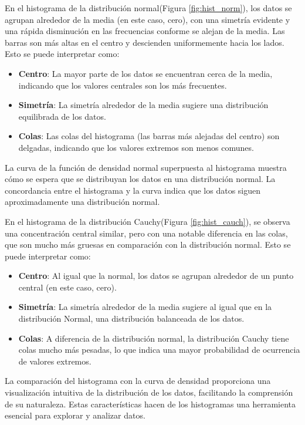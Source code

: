 \documentclass[../Main.tex]{subfiles}
\begin{document}
En el histograma de la distribución normal(Figura \ref{fig:hist_norm}), los datos se agrupan alrededor de la media (en este caso, cero), con una simetría evidente y una rápida disminución en las frecuencias conforme se alejan de la media. Las barras son más altas en el centro y descienden uniformemente hacia los lados. Esto se puede interpretar como:
\begin{itemize}
    \item \textbf{Centro}: La mayor parte de los datos se encuentran cerca de la media, indicando que los valores centrales son los más frecuentes.
    \item \textbf{Simetría}: La simetría alrededor de la media sugiere una distribución equilibrada de los datos.
    \item \textbf{Colas}: Las colas del histograma (las barras más alejadas del centro) son delgadas, indicando que los valores extremos son menos comunes.
\end{itemize}
 La curva de la función de densidad normal superpuesta al histograma muestra cómo se espera que se distribuyan los datos en una distribución normal. La concordancia entre el histograma y la curva indica que los datos siguen aproximadamente una distribución normal.

En el histograma de la distribución Cauchy(Figura \ref{fig:hist_cauch}), se observa una concentración central similar, pero con una notable diferencia en las colas, que son mucho más gruesas en comparación con la distribución normal. Esto se puede interpretar como:
\begin{itemize}
    \item \textbf{Centro}: Al igual que la normal, los datos se agrupan alrededor de un punto central (en este caso, cero).
       \item \textbf{Simetría}: La simetría alrededor de la media sugiere al igual que en la distribución Normal, una distribución balanceada de los datos.
    \item \textbf{Colas}: A diferencia de la distribución normal, la distribución Cauchy tiene colas mucho más pesadas, lo que indica una mayor probabilidad de ocurrencia de valores extremos.
\end{itemize}

 La comparación del histograma con la curva de densidad proporciona una visualización intuitiva de la distribución de los datos, facilitando la comprensión de su naturaleza. Estas características hacen de los histogramas una herramienta esencial para explorar y analizar datos.
\end{document}
